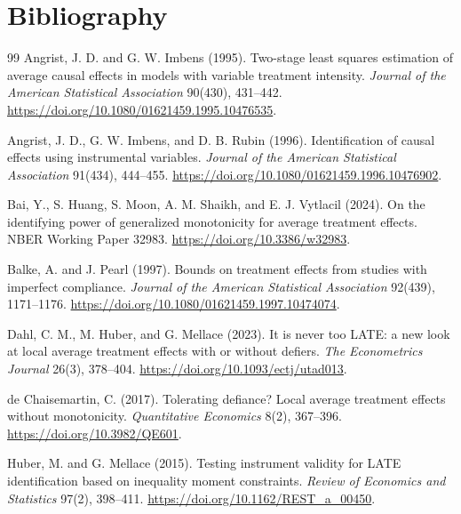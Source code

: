 \documentclass[11pt]{article}
\theoremstyle{definition}
\theoremstyle{plain}
\theoremstyle{remark}
\begin{document}
\section*{Bibliography}
\begin{thebibliography}{99}
Angrist, J. D. and G. W. Imbens (1995).
\newblock Two-stage least squares estimation of average causal effects in models with variable treatment intensity.
\newblock \emph{Journal of the American Statistical Association} 90(430), 431--442.
\newblock \url{https://doi.org/10.1080/01621459.1995.10476535}.

Angrist, J. D., G. W. Imbens, and D. B. Rubin (1996).
\newblock Identification of causal effects using instrumental variables.
\newblock \emph{Journal of the American Statistical Association} 91(434), 444--455.
\newblock \url{https://doi.org/10.1080/01621459.1996.10476902}.

Bai, Y., S. Huang, S. Moon, A. M. Shaikh, and E. J. Vytlacil (2024).
\newblock On the identifying power of generalized monotonicity for average treatment effects.
\newblock NBER Working Paper 32983.
\newblock \url{https://doi.org/10.3386/w32983}.

Balke, A. and J. Pearl (1997).
\newblock Bounds on treatment effects from studies with imperfect compliance.
\newblock \emph{Journal of the American Statistical Association} 92(439), 1171--1176.
\newblock \url{https://doi.org/10.1080/01621459.1997.10474074}.

Dahl, C. M., M. Huber, and G. Mellace (2023).
\newblock It is never too LATE: a new look at local average treatment effects with or without defiers.
\newblock \emph{The Econometrics Journal} 26(3), 378--404.
\newblock \url{https://doi.org/10.1093/ectj/utad013}.

de Chaisemartin, C. (2017).
\newblock Tolerating defiance? Local average treatment effects without monotonicity.
\newblock \emph{Quantitative Economics} 8(2), 367--396.
\newblock \url{https://doi.org/10.3982/QE601}.

Huber, M. and G. Mellace (2015).
\newblock Testing instrument validity for LATE identification based on inequality moment constraints.
\newblock \emph{Review of Economics and Statistics} 97(2), 398--411.
\newblock \url{https://doi.org/10.1162/REST_a_00450}.


\end{thebibliography}
\end{document}
